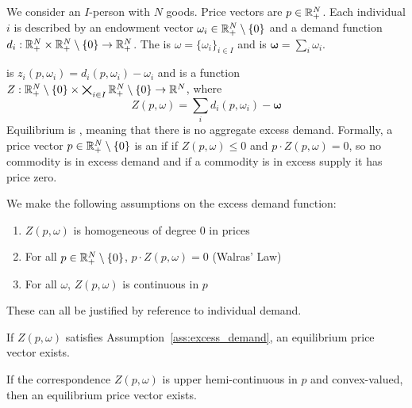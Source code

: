 \documentclass[10pt]{article}
\begin{document}
\begin{model}
	 We consider an $I$-person  with $N$ goods. Price vectors are $p \in \mathbb{R}^N_+$. Each individual  $i$ is described by an endowment vector $\omega_i \in \mathbb{R}^N_{+}\setminus \{0\}$ and a demand function $d_i:\mathbb{R}^N_+ \times \mathbb{R}^N_{+}\setminus \{0\} \to \mathbb{R}^N_+$. The  is $\omega = \{\omega_i\}_{i\in I}$ and  is $\bm{\omega} = \sum_i \omega_i$. 
	
	\begin{definition}
		 is $z_i(p,\omega_i) = d_i(p,\omega_i) - \omega_i$ and  is a function $Z: \mathbb{R}^N_{+}\setminus \{0\} \times \bigtimes_{i\in I} \mathbb{R}^N_{+}\setminus \{0\} \to \mathbb{R}^N$, where \[Z(p,\omega) = \sum_{i} d_i(p,\omega_i) - \bm{\omega}\]
		Equilibrium is , meaning that there is no aggregate excess demand. Formally, a price vector $p \in \mathbb{R}^N_{+}\setminus \{0\}$ is an  if if $Z(p,\omega) \le 0$ and $p \cdot Z(p,\omega) = 0$, so no commodity is in excess demand and if a commodity is in excess supply it has price zero.
	\end{definition}
	
	\begin{assumption}\label{ass:excess_demand}
		We make the following assumptions on the excess demand function:
		\begin{enumerate}
			\item $Z(p,\omega)$ is homogeneous of degree 0 in prices
			\item For all $p \in \mathbb{R}^N_+ \setminus \{0\}$, $p \cdot Z(p,\omega) = 0$ (Walras' Law)
			\item For all $\omega$, $Z(p,\omega)$ is continuous in $p$
		\end{enumerate}
	\end{assumption}
	These can all be justified by reference to individual demand.
\end{model}

\begin{theorem}\label{thm:excess_demand_equilibrium}
	If $Z(p,\omega)$ satisfies Assumption~\ref{ass:excess_demand}, an equilibrium price vector exists.
\end{theorem}
\begin{corollary}
	If the correspondence $Z(p,\omega)$ is upper hemi-continuous in $p$ and convex-valued, then an equilibrium price vector exists.
\end{corollary}
\end{document}
